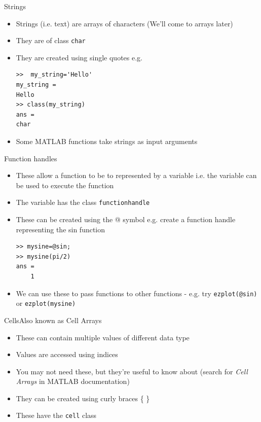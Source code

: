 \documentclass{beamer}
\begin{document}
\begin{frame}[fragile]{Strings}
	\begin{itemize}
		\item Strings (i.e. text) are arrays of characters (We'll come to arrays later)
		\item They are of class \texttt{char}
		\item They are created using single quotes e.g.
		
		\begin{lstlisting}[style=Matlab-editor]
>>  my_string='Hello'
my_string = 
Hello
>> class(my_string)
ans = 
char
		\end{lstlisting}
		\item Some MATLAB functions take strings as input arguments
	\end{itemize}
\end{frame}

\begin{frame}[fragile]{Function handles}
	\begin{itemize}
		\item These allow a function to be to represented by a variable i.e. the variable can be used to execute the function
		\item The variable has the class \texttt{function\textunderscore handle}
		\item These can be created using the @ symbol e.g. create a function handle representing the sin function

		\begin{lstlisting}[style=Matlab-editor]
>> mysine=@sin;
>> mysine(pi/2)
ans =
    1
		\end{lstlisting}
		\item We can use these to pass functions to other functions - e.g. try \lstinline[style=Matlab-editor]!ezplot(@sin)! or \lstinline[style=Matlab-editor]!ezplot(mysine)!
	\end{itemize}
\end{frame}

\begin{frame}{Cells}{Also known as Cell Arrays}
	\begin{itemize}
		\item These can contain multiple values of different data type
		\item Values are accessed using indices
		\item You may not need these, but they're useful to know about (search for \emph{Cell Arrays} in MATLAB documentation)
		\item They can be created using curly braces \{ \}
		\item These have the \texttt{cell} class
	\end{itemize}
\end{frame}
\end{document}
